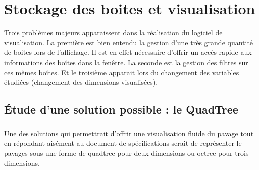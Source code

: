 \chapter{Stockage des boites et visualisation}
Trois problèmes majeurs apparaissent dans la réalisation du logiciel de visualisation. La première est bien entendu la gestion d'une très grande quantité de boites lors de l'affichage. Il est en effet nécessaire d'offrir un accès rapide aux informations des boîtes dans la fenêtre. La seconde est la gestion des filtres sur ces mêmes boîtes. Et le troisième apparait lors du changement des variables étudiées (changement des dimensions visualisées).

\section{\'Etude d'une solution possible : le QuadTree}
\paragraph{}Une des solutions qui permettrait d'offrir une visualisation fluide du pavage tout en répondant aisément au document de spécifications serait de représenter le pavages sous une forme de quadtree pour deux dimensions ou octree pour trois dimensions.

